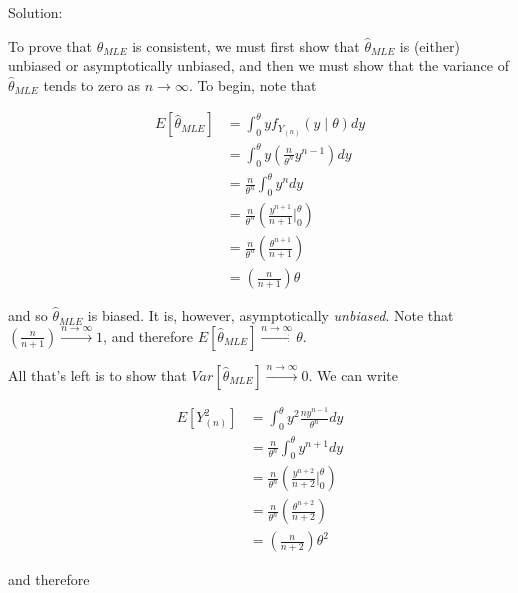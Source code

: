 \documentclass[
  letterpaper,
  DIV=11,
  numbers=noendperiod]{scrreprt}
\begin{document}
Solution:

To prove that \(\hat{\theta}_{MLE}\) is consistent, we must first show
that \(\hat{\theta}_{MLE}\) is (either) unbiased or asymptotically
unbiased, and then we must show that the variance of
\(\hat{\theta}_{MLE}\) tends to zero as \(n \to \infty\). To begin, note
that

\begin{align*}
    E\left[\hat{\theta}_{MLE}\right] & = \int_{0}^\theta y f_{Y_{(n)}} (y \mid \theta) dy \\
    & = \int_{0}^\theta y \left( \frac{n}{\theta^n} y^{n-1} \right) dy \\
    & = \frac{n}{\theta^n} \int_0^\theta y^n dy \\
    & = \frac{n}{\theta^n} \left( \frac{y^{n + 1}}{n + 1} \bigg|_0^\theta \right) \\
    & = \frac{n}{\theta^n} \left( \frac{\theta^{n + 1}}{n + 1} \right) \\
    & = \left( \frac{n}{n + 1} \right) \theta
\end{align*}

and so \(\hat{\theta}_{MLE}\) is biased. It is, however, asymptotically
\emph{unbiased}. Note that
\(\left( \frac{n}{n + 1} \right) \overset{n \to \infty}{\to} 1\), and
therefore
\(E\left[\hat{\theta}_{MLE}\right] \overset{n \to \infty}{\to} \theta\).

All that's left is to show that
\(Var\left[\hat{\theta}_{MLE}\right] \overset{n \to \infty}{\to} 0\). We
can write

\begin{align*}
        E\left[Y_{(n)}^2\right] & = \int_0^\theta y^2 \frac{ny^{n-1}}{\theta^n} dy \\
        & = \frac{n}{\theta^n} \int_0^\theta y^{n + 1} dy \\
        & = \frac{n}{\theta^n} \left( \frac{y^{n + 2}}{n + 2} \bigg|_0^\theta \right) \\
        & = \frac{n}{\theta^n} \left( \frac{\theta^{n + 2}}{n + 2}\right) \\
        & = \left( \frac{n}{n + 2} \right) \theta^2
    \end{align*}

and therefore
\end{document}

